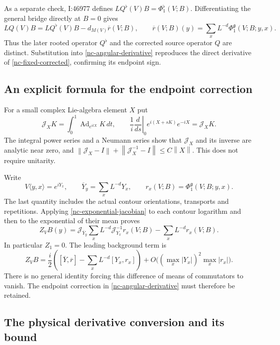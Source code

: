 \documentclass[11pt]{article}
\theoremstyle{remark}
\newcommand{\norm}[1]{\left\|#1\right\|}
\begin{document}
As a separate check, I:46977 defines
$LQ^{\flat}(V)B=\Phi_1^{\flat}(V;B)$. Differentiating the
general bridge directly at $B=0$ gives
\begin{equation}
 LQ(V)B=LQ^{\flat}(V)B-d_{M(V)}\overline r(V;B),
 \qquad
 \overline r(V;B)(y)=\sum_xL^{-d}\Phi_1^{\mathfrak g}(V;B;y,x).
 \label{nc-rooted-versus-corrected}
\end{equation}
Thus the later rooted operator $Q^{\flat}$ and the corrected source
operator $Q$ are distinct. Substitution into
\eqref{nc-angular-derivative} reproduces the direct derivative of
\eqref{nc-fixed-corrected}, confirming its endpoint sign.

\subsection{An explicit formula for the endpoint correction}
\label{nc-jacobians}

For a small complex Lie-algebra element $X$ put
\begin{equation}
 \mathcal J_XK=\int_0^1\operatorname{Ad}_{e^{itX}}K\,dt,
 \qquad
 \frac1i\left.\frac d{ds}\right|_0e^{i(X+sK)}e^{-iX}
           =\mathcal J_XK.
 \label{nc-exponential-jacobian}
\end{equation}
The integral power series and a Neumann series show that
$\mathcal J_X$ and its inverse are analytic near zero, and
$\norm{\mathcal J_X-I}+\norm{\mathcal J_X^{-1}-I}\le C\norm{X}$.
This does not require unitarity.

Write
\[
 V\langle y,x\rangle=e^{iY_x},\qquad
 \overline Y_y=\sum_xL^{-d}Y_x,\qquad
 r_x(V;B)=\Phi_1^{\mathfrak g}(V;B;y,x).
\]
The last quantity includes the actual contour orientations,
transports and repetitions. Applying
\eqref{nc-exponential-jacobian} to each contour logarithm and then
to the exponential of their mean proves
\begin{equation}
 Z_VB(y)=\mathcal J_{\overline Y_y}
       \sum_xL^{-d}\mathcal J_{Y_x}^{-1}r_x(V;B)
          -\sum_xL^{-d}r_x(V;B).
 \label{nc-Z-formula}
\end{equation}
In particular $Z_1=0$. The leading background term is
\[
 Z_VB=\frac i2\left(
   [\overline Y,\overline r]-\sum_xL^{-d}[Y_x,r_x]\right)
   +O\bigl((\max_x|Y_x|)^2\max_x|r_x|\bigr).
\]
There is no general identity forcing this difference of means of
commutators to vanish. The endpoint correction in
\eqref{nc-angular-derivative} must therefore be retained.

\subsection{The physical derivative conversion and its bound}
\label{nc-physical}
\end{document}

